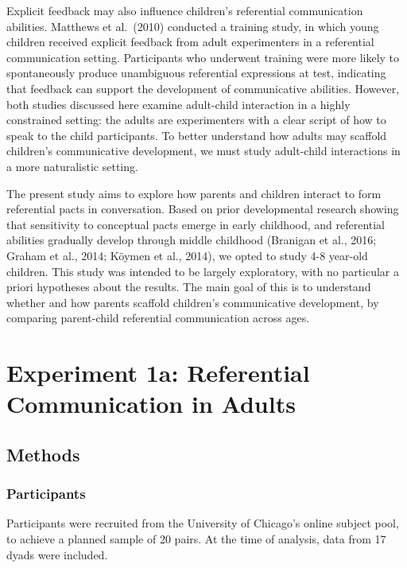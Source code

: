 \documentclass[10pt, letterpaper]{article}
\begin{document}
Explicit feedback may also influence children's referential
communication abilities. Matthews et al.~(2010) conducted a training
study, in which young children received explicit feedback from adult
experimenters in a referential communication setting. Participants who
underwent training were more likely to spontaneously produce unambiguous
referential expressions at test, indicating that feedback can support
the development of communicative abilities. However, both studies
discussed here examine adult-child interaction in a highly constrained
setting: the adults are experimenters with a clear script of how to
speak to the child participants. To better understand how adults may
scaffold children's communicative development, we must study adult-child
interactions in a more naturalistic setting.

The present study aims to explore how parents and children interact to
form referential pacts in conversation. Based on prior developmental
research showing that sensitivity to conceptual pacts emerge in early
childhood, and referential abilities gradually develop through middle
childhood (Branigan et al., 2016; Graham et al., 2014; Köymen et al.,
2014), we opted to study 4-8 year-old children. This study was intended
to be largely exploratory, with no particular a priori hypotheses about
the results. The main goal of this is to understand whether and how
parents scaffold children's communicative development, by comparing
parent-child referential communication across ages.

\hypertarget{experiment-1a-referential-communication-in-adults}{%
\section{Experiment 1a: Referential Communication in
Adults}\label{experiment-1a-referential-communication-in-adults}}

\hypertarget{methods}{%
\subsection{Methods}\label{methods}}

\hypertarget{participants}{%
\subsubsection{Participants}\label{participants}}

Participants were recruited from the University of Chicago's online
subject pool, to achieve a planned sample of 20 pairs. At the time of
analysis, data from 17 dyads were included.
\end{document}
